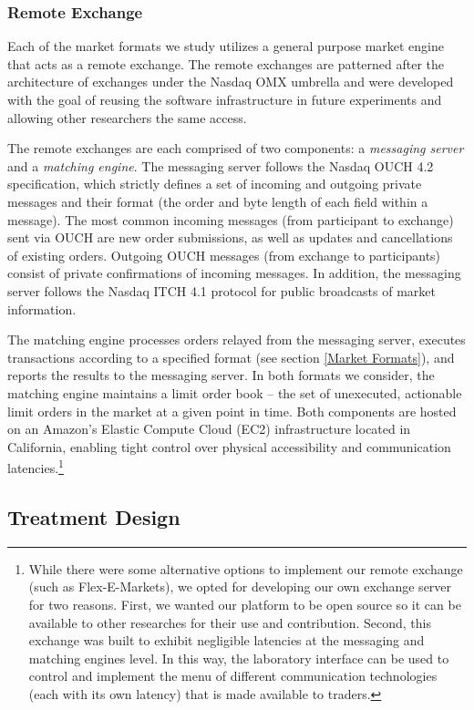 \documentclass[12pt]{article}
\begin{document}
\subsubsection{Remote Exchange}

Each of the market formats we study utilizes a general purpose market engine that acts as a remote exchange. The remote exchanges are patterned after the architecture of exchanges under the Nasdaq OMX umbrella and were developed with the goal of reusing the software infrastructure in future experiments and allowing other researchers the same access.

The remote exchanges are each comprised of two components: a \textit{messaging server} and a \textit{matching engine}. The messaging server follows the Nasdaq OUCH 4.2 specification, which strictly defines a set of incoming and outgoing private messages and their format (the order and byte length of each field within a message). The most common incoming messages (from participant to exchange) sent via OUCH are new order submissions, as well as updates and cancellations of existing orders. Outgoing OUCH messages (from exchange to participants) consist of private confirmations of incoming messages. In addition, the messaging server follows the Nasdaq ITCH 4.1 protocol for public broadcasts of market information. 

The matching engine processes orders relayed from the messaging server, executes transactions according to a specified format (see section \ref{Market Formats}), and reports the results to the messaging server. In both formats we consider, the matching engine maintains a limit order book -- the set of unexecuted, actionable limit orders in the market at a given point in time. Both components are hosted on an Amazon’s Elastic Compute Cloud (EC2) infrastructure located in California, enabling tight control over physical accessibility and communication latencies.\footnote{While there were some alternative options to implement our remote exchange (such as Flex-E-Markets), we opted for developing our own exchange server for two reasons. First, we wanted our platform to be open source so it can be available to other researches for their use and contribution. Second, this exchange was built to exhibit negligible latencies at the messaging and matching engines level. In this way, the laboratory interface can be used to control and implement the menu of different communication technologies (each with its own latency) that is made available to traders.}


\subsection{Treatment Design}
\label{sec:treatments}
\end{document}
